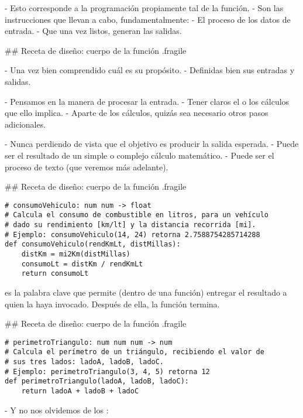 - Esto corresponde a la programación propiamente tal de la función.
- Son las instrucciones que llevan a cabo, fundamentalmente:
    - El proceso de los datos de entrada.
    - Que una vez listos, generan las salidas.

## Receta de diseño: cuerpo de la función {.fragile}


- Una vez bien comprendido cuál es su propósito.
    - Definidas bien sus entradas y salidas.

- Pensamos en la manera de procesar la entrada.
    - Tener claros el o los cálculos que ello implica.
    - Aparte de los cálculos, quizás sea necesario otros pasos adicionales.

- Nunca perdiendo de vista que el objetivo es producir la salida esperada.
    - Puede ser el resultado de un simple o complejo cálculo matemático.
    - Puede ser el proceso de texto (que veremos más adelante).

## Receta de diseño: cuerpo de la función {.fragile}


\begin{lstlisting}
# consumoVehiculo: num num -> float
# Calcula el consumo de combustible en litros, para un vehículo
# dado su rendimiento [km/lt] y la distancia recorrida [mi].
# Ejemplo: consumoVehiculo(14, 24) retorna 2.7588754285714288
def consumoVehiculo(rendKmLt, distMillas):
    distKm = mi2Km(distMillas)
    consumoLt = distKm / rendKmLt
    return consumoLt
\end{lstlisting}

\bgnblockdefinition
{} es la palabra clave que permite (dentro de una función)
entregar el resultado a quien la haya invocado. Después de ella, la función
termina.
\trmblockdefinition

## Receta de diseño: cuerpo de la función {.fragile}


\begin{lstlisting}
# perimetroTriangulo: num num num -> num
# Calcula el perímetro de un triángulo, recibiendo el valor de
# sus tres lados: ladoA, ladoB, ladoC.
# Ejemplo: perimetroTriangulo(3, 4, 5) retorna 12
def perimetroTriangulo(ladoA, ladoB, ladoC):
    return ladoA + ladoB + ladoC
\end{lstlisting}

- Y no nos olvidemos de los :


